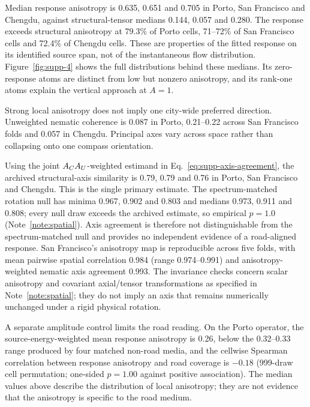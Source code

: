 
Median response anisotropy is 0.635, 0.651 and 0.705 in Porto, San Francisco and Chengdu, against structural-tensor medians 0.144, 0.057 and 0.280. The response exceeds structural anisotropy at 79.3\% of Porto cells, 71--72\% of San Francisco cells and 72.4\% of Chengdu cells. These are properties of the fitted response on its identified source span, not of the instantaneous flow distribution. Figure~\ref{fig:supp-4} shows the full distributions behind these medians. Its zero-response atoms are distinct from low but nonzero anisotropy, and its rank-one atoms explain the vertical approach at $A=1$.

Strong local anisotropy does not imply one city-wide preferred direction. Unweighted nematic coherence is 0.087 in Porto, 0.21--0.22 across San Francisco folds and 0.057 in Chengdu. Principal axes vary across space rather than collapsing onto one compass orientation.

Using the joint $A_{C}A_{U}$-weighted estimand in Eq.~\ref{eq:supp-axis-agreement}, the archived structural-axis similarity is 0.79, 0.79 and 0.76 in Porto, San Francisco and Chengdu. This is the single primary estimate. The spectrum-matched rotation null has minima 0.967, 0.902 and 0.803 and medians 0.973, 0.911 and 0.808; every null draw exceeds the archived estimate, so empirical $p=1.0$ (Note~\ref{note:spatial}). Axis agreement is therefore not distinguishable from the spectrum-matched null and provides no independent evidence of a road-aligned response. San Francisco's anisotropy map is reproducible across five folds, with mean pairwise spatial correlation 0.984 (range 0.974--0.991) and anisotropy-weighted nematic axis agreement 0.993. The invariance checks concern scalar anisotropy and covariant axial/tensor transformations as specified in Note~\ref{note:spatial}; they do not imply an axis that remains numerically unchanged under a rigid physical rotation.

A separate amplitude control limits the road reading. On the Porto operator, the source-energy-weighted mean response anisotropy is 0.26, below the 0.32--0.33 range produced by four matched non-road media, and the cellwise Spearman correlation between response anisotropy and road coverage is $-0.18$ (999-draw cell permutation; one-sided $p=1.00$ against positive association). The median values above describe the distribution of local anisotropy; they are not evidence that the anisotropy is specific to the road medium.
